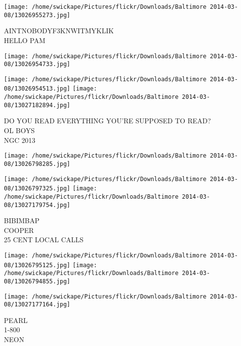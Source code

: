 \documentclass[10pt,letterpaper]{article}
\begin{document}
\vspace{0.25in}
\texttt{[image: /home/swickape/Pictures/flickr/Downloads/Baltimore 2014-03-08/13026955273.jpg]}

AINTNOBODYF3KNWITMYKLIK\\
HELLO PAM
\pagebreak

\texttt{[image: /home/swickape/Pictures/flickr/Downloads/Baltimore 2014-03-08/13026954733.jpg]}

\vspace{0.25in}
\texttt{[image: /home/swickape/Pictures/flickr/Downloads/Baltimore 2014-03-08/13026954513.jpg]}
\texttt{[image: /home/swickape/Pictures/flickr/Downloads/Baltimore 2014-03-08/13027182894.jpg]}

DO YOU READ EVERYTHING YOU'RE SUPPOSED TO READ?\\
OL BOYS\\
NGC 2013
\pagebreak

\texttt{[image: /home/swickape/Pictures/flickr/Downloads/Baltimore 2014-03-08/13026798285.jpg]}

\vspace{0.25in}
\texttt{[image: /home/swickape/Pictures/flickr/Downloads/Baltimore 2014-03-08/13026797325.jpg]}
\texttt{[image: /home/swickape/Pictures/flickr/Downloads/Baltimore 2014-03-08/13027179754.jpg]}

BIBIMBAP\\
COOPER\\
25 CENT LOCAL CALLS
\pagebreak

\texttt{[image: /home/swickape/Pictures/flickr/Downloads/Baltimore 2014-03-08/13026795125.jpg]}
\texttt{[image: /home/swickape/Pictures/flickr/Downloads/Baltimore 2014-03-08/13026794855.jpg]}

\texttt{[image: /home/swickape/Pictures/flickr/Downloads/Baltimore 2014-03-08/13027177164.jpg]}

PEARL\\
1{-}800\\
NEON
\pagebreak
\end{document}

